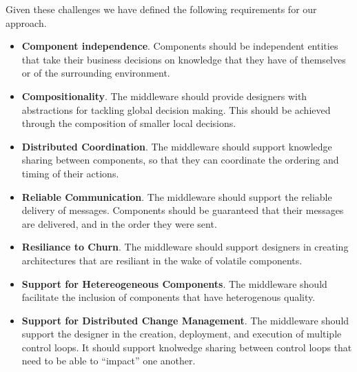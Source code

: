 Given these challenges we have defined the following requirements for our approach.

\begin{itemize}
	\item \textbf{Component independence}. Components should be independent entities that take their business decisions on knowledge that they have of themselves or of the surrounding environment. 
	\item \textbf{Compositionality}. The middleware should provide designers with abstractions for tackling global decision making. This should be achieved through the composition of smaller local decisions.
	\item \textbf{Distributed Coordination}. The middleware should support knowledge sharing between components, so that they can coordinate the ordering and timing of their actions.
	\item \textbf{Reliable Communication}. The middleware should support the reliable delivery of messages. Components should be guaranteed that their messages are delivered, and in the order they were sent. 
	\item \textbf{Resiliance to Churn}. The middleware should support designers in creating architectures that are resiliant in the wake of volatile components. 
	\item \textbf{Support for Hetereogeneous Components}. The middleware should facilitate the inclusion of components that have heterogenous quality.
	\item \textbf{Support for Distributed Change Management}. The middleware should support the designer in the creation, deployment, and execution of multiple control loops. It should support knolwedge sharing between control loops that need to be able to ``impact'' one another. 
\end{itemize}

